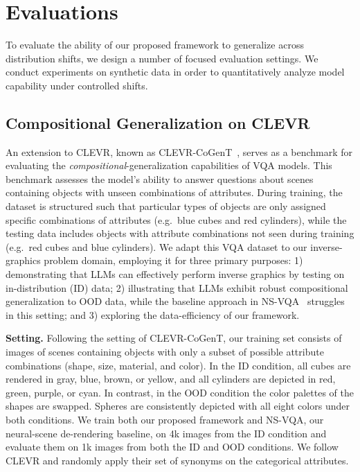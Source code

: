 \section{Evaluations}\label{sec:evaluations}

To evaluate the ability of our proposed framework to generalize across distribution shifts, we design a number of focused evaluation settings.
We conduct experiments on synthetic data in order to quantitatively analyze model capability under controlled shifts.

\subsection{Compositional Generalization on CLEVR}\label{ssec:clevr}
An extension to CLEVR, known as CLEVR-CoGenT~\citep{johnson2017clevr}, serves as a benchmark for evaluating the \textit{compositional}-generalization capabilities of VQA models.
This benchmark assesses the model's ability to answer questions about scenes containing objects with unseen combinations of attributes.
During training, the dataset is structured such that particular types of objects are only assigned specific combinations of attributes (e.g.~blue cubes and red cylinders), while the testing data includes objects with attribute combinations not seen during training (e.g.~red cubes and blue cylinders).
We adapt this VQA dataset to our inverse-graphics problem domain, employing it for three primary purposes:
1) demonstrating that LLMs can effectively perform inverse graphics by testing on in-distribution (ID) data;
2) illustrating that LLMs exhibit robust compositional generalization to OOD data, while the baseline approach in NS-VQA~\citep{yi2018neural} struggles in this setting; and
3) exploring the data-efficiency of our framework.

\noindent\textbf{Setting.}
Following the setting of CLEVR-CoGenT, our training set consists of images of scenes containing objects with only a subset of possible attribute combinations (shape, size, material, and color).
In the ID condition, all cubes are rendered in gray, blue, brown, or yellow, and all cylinders are depicted in red, green, purple, or cyan.
In contrast, in the OOD condition the color palettes of the shapes are swapped.
Spheres are consistently depicted with all eight colors under both conditions.
We train both our proposed framework and NS-VQA, our neural-scene de-rendering baseline, on 4k images from the ID condition and evaluate them on 1k images from both the ID and OOD conditions. We follow CLEVR and randomly apply their set of synonyms on the categorical attributes.

